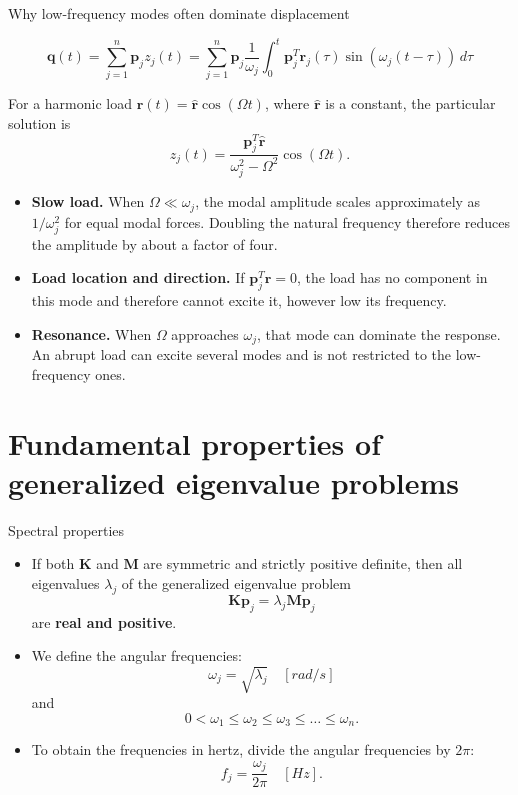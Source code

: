 \documentclass[aspectratio=169]{beamer}
\begin{document}
\begin{frame}{Why low-frequency modes often dominate displacement}
  \vspace{-0.2cm}
  \small \begin{tcolorbox}[colback=darkred!10,colframe=darkred!40!black]
    $$\mathbf q(t)=\sum_{j=1}^{n}\mathbf p_jz_j(t)=\sum_{j=1}^{n}\mathbf p_j\frac{1}{\omega_j}\int_0^t \mathbf p^T_j\mathbf r_{j}(\tau)\sin(\omega_j(t-\tau))\, d\tau$$
  \end{tcolorbox}
  For a harmonic load $\mathbf r(t)=\hat{\mathbf r}\cos(\Omega t)$, where $\hat{\mathbf r}$ is a constant, the particular solution is
  \[
    z_j(t)=
    \frac{\mathbf p_j^T\hat{\mathbf r}}{\omega_j^2-\Omega^2}\cos(\Omega t).
  \]
  \vspace{-0.4cm}
  \begin{itemize}
    \item \textbf{Slow load.} When $\Omega\ll\omega_j$, the modal amplitude
          scales approximately as $1/\omega_j^2$ for equal modal forces. Doubling
          the natural frequency therefore reduces the amplitude by about a factor
          of four.
    \item \textbf{Load location and direction.} If
          $\mathbf p_j^T\hat{\mathbf r}=0$, the load has no component in this mode
          and therefore cannot excite it, however low its frequency.
    \item \textbf{Resonance.} When $\Omega$ approaches $\omega_j$, that mode can
          dominate the response. An abrupt load can excite several modes and is not
          restricted to the low-frequency ones.
  \end{itemize}
\end{frame}

\section{Fundamental properties of generalized eigenvalue problems}

\begin{frame}{Spectral properties}
  \small
  \begin{itemize}
    \item If both $\mathbf{K}$ and $\mathbf{M}$ are symmetric and strictly positive definite, then all eigenvalues $\lambda_j$ of the generalized eigenvalue problem
          $$\mathbf{K} \mathbf{p}_j = \lambda_j \mathbf{M} \mathbf{p}_j$$
          are \textbf{real and positive}.
    \item We define the angular frequencies:
          $$\omega_j=\sqrt{\lambda_j}\quad [rad/s]$$
          and
          $$0<\omega_1\leq \omega_2\leq\omega_3\leq\dots\leq\omega_n.$$
    \item To obtain the frequencies in hertz, divide the angular frequencies by $2\pi$:
          $$f_j=\frac{\omega_j}{2\pi}\quad [Hz].$$
  \end{itemize}
\end{frame}
\end{document}
